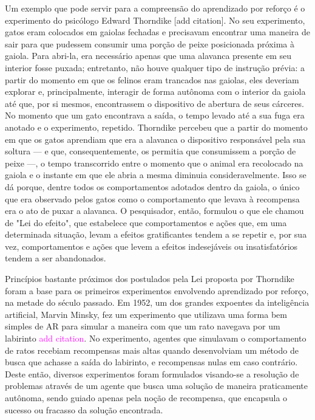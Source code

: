 \documentclass[cic,tc]{iiufrgs}
\newcommand\bruno[1]{\textcolor{magenta}{#1}}
\begin{document}
Um exemplo que pode servir para a compreensão do aprendizado por reforço é o
experimento do psicólogo Edward Thorndike [add citation]. No seu experimento,
gatos eram
colocados em gaiolas fechadas e precisavam encontrar uma maneira de sair para
que pudessem consumir uma porção de peixe posicionada próxima à gaiola. Para
abri-la, era necessário apenas que uma alavanca presente em seu interior fosse
puxada; entretanto, não houve qualquer tipo de instrução prévia: a partir do
momento em que os felinos eram trancados nas gaiolas, eles deveriam explorar e,
principalmente, interagir de forma autônoma com o interior da gaiola até que,
por si mesmos, encontrassem o dispositivo de abertura de seus cárceres. No
momento que um gato encontrava a saída, o tempo levado até a sua fuga era
anotado e o experimento, repetido. Thorndike percebeu que a partir do momento em
que os
gatos aprendiam que era a alavanca o dispositivo responsável pela sua soltura
--- e que, consequentemente, os permitia que consumissem a porção de peixe ---,
o tempo transcorrido entre o momento que o animal era recolocado na gaiola e o
instante em que ele abria a mesma diminuia consideravelmente. Isso se dá porque,
dentre todos os comportamentos adotados dentro da gaiola, o único que era
observado pelos gatos como o comportamento que levava à recompensa era o ato de
puxar a alavanca. O pesquisador, então, formulou o que ele chamou de "Lei do
efeito", que estabelece que comportamentos e ações que, em uma determinada
situação, levam a efeitos gratificantes tendem a se repetir e, por sua vez,
comportamentos e ações que levem a efeitos indesejáveis ou insatisfatórios
tendem a ser abandonados.


Princípios bastante próximos dos postulados pela Lei proposta por Thorndike
foram a base para os primeiros experimentos envolvendo aprendizado por reforço,
na metade do século passado. Em 1952, um dos grandes expoentes da inteligência
artificial, Marvin Minsky, fez um experimento que utilizava uma forma bem
simples de AR para simular a maneira com que um rato navegava por um labirinto
\bruno{add citation}. No experimento, agentes que simulavam o comportamento de
ratos recebiam recompensas mais altas quando desenvolviam um método de busca que
achasse a saída do labirinto, e recompensas nulas em caso contrário. Deste
então, diversos experimentos foram formulados visando-se a resolução de
problemas através de um agente que busca uma solução de maneira praticamente
autônoma, sendo guiado apenas pela noção de recompensa, que encapsula o sucesso
ou fracasso da solução encontrada.
\end{document}
